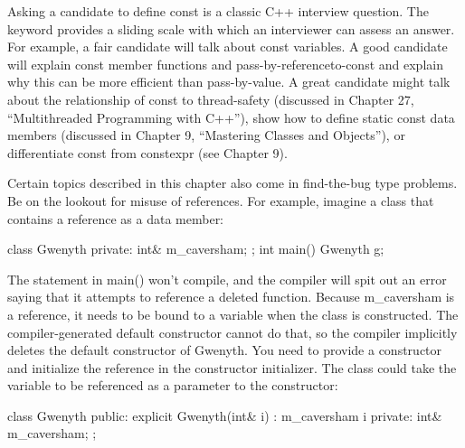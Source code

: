 Asking a candidate to define const is a classic C++ interview question. The keyword provides a sliding scale with which an interviewer can assess an answer. For example, a fair candidate will talk about const variables. A good candidate will explain const member functions and pass-by-referenceto-const and explain why this can be more efficient than pass-by-value. A great candidate might talk about the relationship of const to thread-safety (discussed in Chapter 27, “Multithreaded Programming with C++”), show how to define static const data members (discussed in Chapter 9, “Mastering Classes and Objects”), or differentiate const from constexpr (see Chapter 9).

Certain topics described in this chapter also come in find-the-bug type problems. Be on the lookout for misuse of references. For example, imagine a class that contains a reference as a data member:

\begin{cpp}
class Gwenyth
{
    private:
        int& m_caversham;
};
int main()
{
    Gwenyth g;
}
\end{cpp}

The statement in main() won’t compile, and the compiler will spit out an error saying that it attempts to reference a deleted function. Because m\_caversham is a reference, it needs to be bound to a variable when the class is constructed. The compiler-generated default constructor cannot do that, so the compiler implicitly deletes the default constructor of Gwenyth. You need to provide a constructor and initialize the reference in the constructor initializer. The class could take the variable to be referenced as a parameter to the constructor:

\begin{cpp}
class Gwenyth
{
    public:
        explicit Gwenyth(int& i) : m_caversham { i } { }
    private:
        int& m_caversham;
};
\end{cpp}
